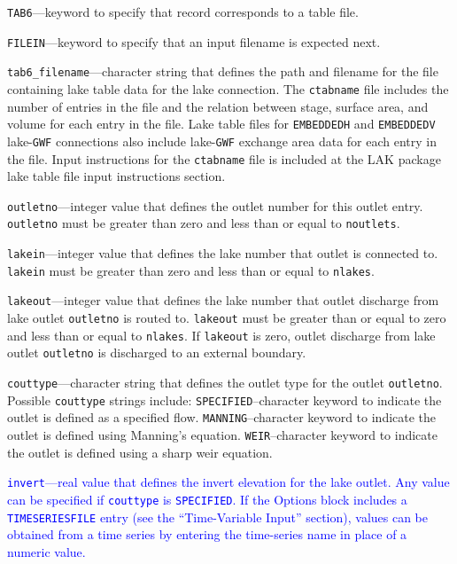 \item \texttt{TAB6}---keyword to specify that record corresponds to a table file.

\item \texttt{FILEIN}---keyword to specify that an input filename is expected next.

\item \texttt{tab6\_filename}---character string that defines the path and filename for the file containing lake table data for the lake connection. The \texttt{ctabname} file includes the number of entries in the file and the relation between stage, surface area, and volume for each entry in the file. Lake table files for \texttt{EMBEDDEDH} and \texttt{EMBEDDEDV} lake-\texttt{GWF} connections also include lake-\texttt{GWF} exchange area data for each entry in the file. Input instructions for the \texttt{ctabname} file is included at the LAK package lake table file input instructions section.

\item \texttt{outletno}---integer value that defines the outlet number for this outlet entry. \texttt{outletno} must be greater than zero and less than or equal to \texttt{noutlets}.

\item \texttt{lakein}---integer value that defines the lake number that outlet is connected to. \texttt{lakein} must be greater than zero and less than or equal to \texttt{nlakes}.

\item \texttt{lakeout}---integer value that defines the lake number that outlet discharge from lake outlet \texttt{outletno} is routed to. \texttt{lakeout} must be greater than or equal to zero and less than or equal to \texttt{nlakes}. If \texttt{lakeout} is zero, outlet discharge from lake outlet \texttt{outletno} is discharged to an external boundary.

\item \texttt{couttype}---character string that defines the outlet type for the outlet \texttt{outletno}. Possible \texttt{couttype} strings include: \texttt{SPECIFIED}--character keyword to indicate the outlet is defined as a specified flow.  \texttt{MANNING}--character keyword to indicate the outlet is defined using Manning's equation. \texttt{WEIR}--character keyword to indicate the outlet is defined using a sharp weir equation.

\item \textcolor{blue}{\texttt{invert}---real value that defines the invert elevation for the lake outlet. Any value can be specified if \texttt{couttype} is \texttt{SPECIFIED}. If the Options block includes a \texttt{TIMESERIESFILE} entry (see the ``Time-Variable Input'' section), values can be obtained from a time series by entering the time-series name in place of a numeric value.}

